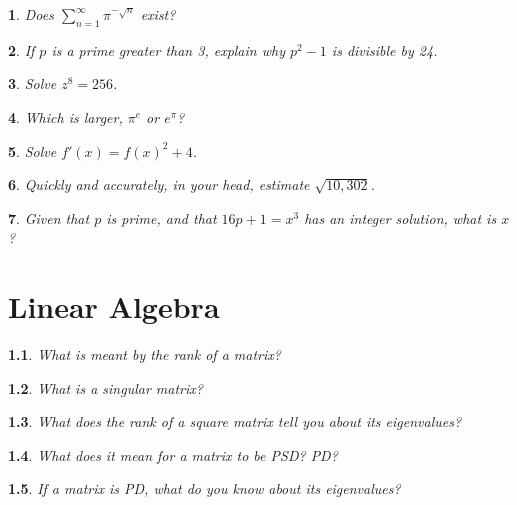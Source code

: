\documentclass{report}
\newtheorem{problem}{}
\numberwithin{problem}{chapter} %
\newcommand{\ds}{\displaystyle}
\begin{document}
\begin{problem}
Does $\ds \sum_{n=1}^\infty \pi^{-\sqrt{n}}$ exist?
\end{problem}

\begin{problem}
\cite{CRACK}
If $p$ is a prime greater than 3, explain why $p^2-1$ is divisible by 24. 
\end{problem}

\begin{problem}
Solve $z^8=256$.
\end{problem}

\begin{problem}
\cite{STRAWA}
Which is larger, $\pi^e$ or $e^\pi$?
\end{problem}

\begin{problem}
Solve $f'(x)=f(x)^2+4$.
\end{problem}

\begin{problem}
Quickly and accurately, in your head, estimate $\sqrt{10,302}$.
\end{problem}

\begin{problem}
Given that $p$ is prime, and that $16p+1 = x^3$ has an integer solution, what is $x$?
\end{problem}


\chapter{Linear Algebra}

\begin{problem}
What is meant by the {\it rank} of a matrix? 
\end{problem}

\begin{problem}
What is a  {\it singular} matrix? 
\end{problem}

\begin{problem}
What does the rank of a square matrix tell you about its eigenvalues?
\end{problem}

\begin{problem}
What does it mean for a matrix to be PSD? PD?
\end{problem}

\begin{problem}
If a matrix is PD, what do you know about its eigenvalues?
\end{problem}
\end{document}
